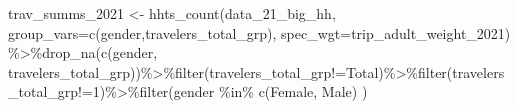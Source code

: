 \documentclass[
  12pt,
]{article}
\newenvironment{Shaded}{\begin{snugshade}}{\end{snugshade}}
\newcommand{\AttributeTok}[1]{\textcolor[rgb]{0.77,0.63,0.00}{#1}}
\newcommand{\FunctionTok}[1]{\textcolor[rgb]{0.00,0.00,0.00}{#1}}
\newcommand{\NormalTok}[1]{#1}
\newcommand{\OtherTok}[1]{\textcolor[rgb]{0.56,0.35,0.01}{#1}}
\newcommand{\SpecialCharTok}[1]{\textcolor[rgb]{0.00,0.00,0.00}{#1}}
\newcommand{\StringTok}[1]{\textcolor[rgb]{0.31,0.60,0.02}{#1}}
\begin{document}
\begin{Shaded}
\begin{Highlighting}[]
\NormalTok{trav\_summs\_2021 }\OtherTok{\textless{}{-}} \FunctionTok{hhts\_count}\NormalTok{(data\_21\_big\_hh,}
                                   \AttributeTok{group\_vars=}\FunctionTok{c}\NormalTok{(}\StringTok{\textquotesingle{}gender\textquotesingle{}}\NormalTok{,}\StringTok{\textquotesingle{}travelers\_total\_grp\textquotesingle{}}\NormalTok{),}
                                   \AttributeTok{spec\_wgt=}\StringTok{\textquotesingle{}trip\_adult\_weight\_2021\textquotesingle{}}\NormalTok{) }\SpecialCharTok{\%\textgreater{}\%}\FunctionTok{drop\_na}\NormalTok{(}\FunctionTok{c}\NormalTok{(}\StringTok{\textquotesingle{}gender\textquotesingle{}}\NormalTok{, }\StringTok{\textquotesingle{}travelers\_total\_grp\textquotesingle{}}\NormalTok{))}\SpecialCharTok{\%\textgreater{}\%}\FunctionTok{filter}\NormalTok{(travelers\_total\_grp}\SpecialCharTok{!=}\StringTok{\textquotesingle{}Total\textquotesingle{}}\NormalTok{)}\SpecialCharTok{\%\textgreater{}\%}\FunctionTok{filter}\NormalTok{(travelers\_total\_grp}\SpecialCharTok{!=}\StringTok{\textquotesingle{}1\textquotesingle{}}\NormalTok{)}\SpecialCharTok{\%\textgreater{}\%}\FunctionTok{filter}\NormalTok{(gender }\SpecialCharTok{\%in\%} \FunctionTok{c}\NormalTok{(}\StringTok{\textquotesingle{}Female\textquotesingle{}}\NormalTok{, }\StringTok{\textquotesingle{}Male\textquotesingle{}}\NormalTok{) )}
\end{Highlighting}
\end{Shaded}
\end{document}

